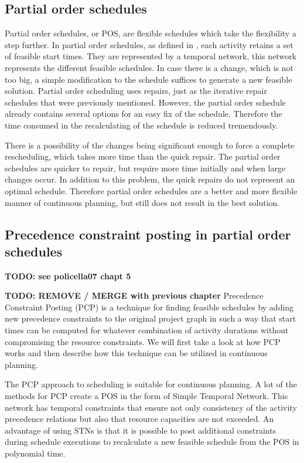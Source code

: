 \documentclass{article}
\newcommand{\TODO}[1]{{\color{red}\textbf{TODO: #1}}}
\begin{document}
\subsection{Partial order schedules}
Partial order schedules, or POS, are flexible schedules which take the flexibility a step further.
In partial order schedules, as defined in \citet{policella07}, each activity retains a set of feasible start times.
They are represented by a temporal network, this network represents the different feasible schedules.
In case there is a change, which is not too big, a simple modification to the schedule suffices to generate a new feasible solution.
Partial order scheduling uses repairs, just as the iterative repair schedules that were previously mentioned.
However, the partial order schedule already contains several options for an easy fix of the schedule.
Therefore the time consumed in the recalculating of the schedule is reduced tremendously.

There is a possibility of the changes being significant enough to force a complete rescheduling, which takes more time than the quick repair.
The partial order schedules are quicker to repair, but require more time initially and when large changes occur.
In addition to this problem, the quick repairs do not represent an optimal schedule.
Therefore partial order schedules are a better and more flexible manner of continuous planning, but still does not result in the best solution.

\subsection{Precedence constraint posting in partial order schedules}
\TODO{see policella07 chapt 5}

\TODO{REMOVE / MERGE with previous chapter}
Precedence Constraint Posting (PCP) is a technique for finding feasible schedules by adding new precedence constraints to the original project graph in such a way that start times can be computed for whatever combination of activity durations without compromising the resource constraints.
We will first take a look at how PCP works and then describe how this technique can be utilized in continuous planning.


The PCP approach to scheduling is suitable for continuous planning.
A lot of the methods for PCP create a POS in the form of Simple Temporal Network.
This network has temporal constraints that ensure not only consistency of the activity precedence relations but also that resource capacities are not exceeded.
An advantage of using STNs is that it is possible to post additional constraints during schedule executions to recalculate a new feasible schedule from the POS in polynomial time.
\end{document}
